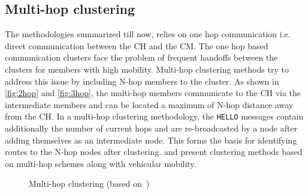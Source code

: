 \documentclass[]{ccs-thesis}
\begin{document}
\subsection{Multi-hop clustering}

The methodologies summarized till now, relies on one hop communication i.e. direct communication between
the \ac{CH} and the \ac{CM}. The one hop based communication clusters face the problem of frequent handoffs between
the clusters for members with high mobility. Multi-hop clustering methods try to address this issue by including N-hop
members to the cluster. As shown in \cref{fig:2hop} and \cref{fig:3hop}, the multi-hop members communicate to the \ac{CH}
via the intermediate members and can be located a maximum of N-hop distance away from the \ac{CH}. In a multi-hop
clustering methodology, the \texttt{HELLO} messages contain additionally the number of current hops and are re-broadcasted
by a node after adding themselves as an intermediate node. This forms the basis for identifying routes to the N-hop nodes
after clustering. \textcite{Zhang2069135} and \textcite{6554933} present clustering methods based on multi-hop schemes
along with vehicular mobility.


\begin{figure}[h]%
    \centering
    \hfill%
    \hfill%
    \caption{Multi-hop clustering (based on~\cite[Figure~1]{6554933})}%
    \label{fig:multihop}%
\end{figure}
\end{document}
